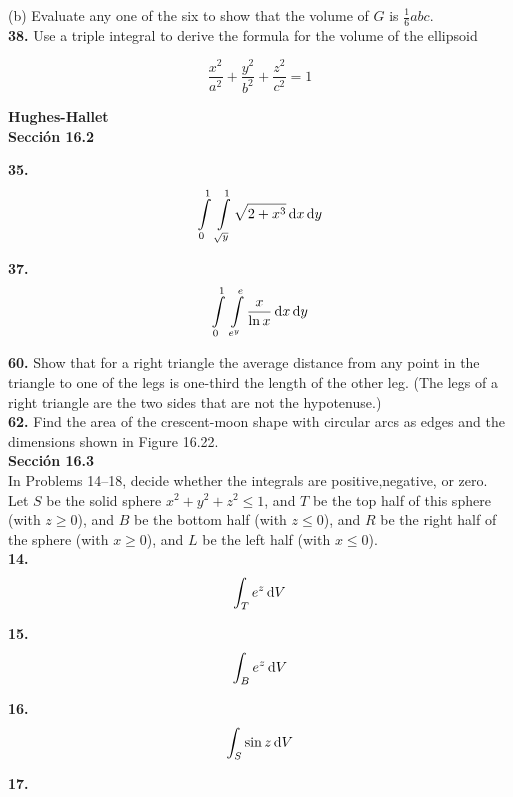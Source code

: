 \documentclass[a4paper,12pt]{article}
\begin{document}
(b) Evaluate any one of the six to show that the volume of $G$ is $\frac{1}{6} abc$. \\

\textbf{38.} Use a triple integral to derive the formula for the volume of the ellipsoid

\[ \frac{x^2}{a^2} + \frac{y^2}{b^2} + \frac{z^2}{c^2} = 1 \]

\textbf{Hughes-Hallet} \\

\textbf{Sección 16.2}

\textbf{35.} \\

\[ \int \limits_0^1 \, \int \limits_{\sqrt{y}}^1 \sqrt{2 + x^3} \, \text dx \, \text dy \]

\textbf{37.} \\

\[ \int \limits_0^1 \, \int \limits_{e^y}^e \frac{x}{\ln{x}} \, \text dx \, \text dy \]

\textbf{60.} Show that for a right triangle the average distance from any point
in the triangle to one of the legs is one-third the length of the other leg.
(The legs of a right triangle are the two sides that are not the hypotenuse.) \\

\textbf{62.} Find the area of the crescent-moon shape with circular arcs as edges
and the dimensions shown in Figure 16.22. \\

\textbf{Sección 16.3} \\

In Problems 14–18, decide whether the integrals are positive,negative, or zero.
Let $S$ be the solid sphere $x^2 + y^2 + z^2 \leq 1$, and $T$ be the top half of
this sphere (with $z \geq 0$), and $B$ be the bottom half (with $z \leq 0$), and $R$
be the right half of the sphere (with $x \geq 0$), and $L$ be the left half
(with $x \leq 0$). \\

\textbf{14.} \\

\[ \int _T e^z \, \text dV \]

\textbf{15.} \\

\[ \int _B e^z \, \text dV \]

\textbf{16.} \\

\[ \int _S \sin{z} \, \text dV \]

\textbf{17.} \\
\end{document}
